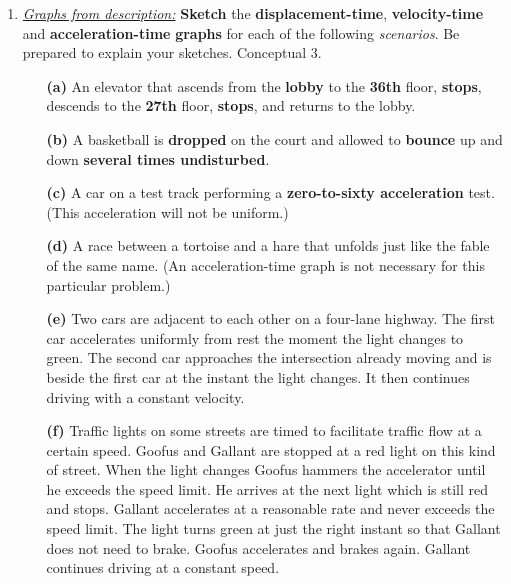 \documentclass[A4,12pt]{article}
\begin{document}
\begin{enumerate}[label=\bfseries (\arabic*)]
\begin{figure}[H]
\end{figure}
%
%
\clearpage
\newpage
%
%
%
%
%
%
%
%
%
%
%
%
%
%
%
%
%
%
%
%
%
%
%
%
%
%
%
\item \href{https://physics.info/motion-graphs/problems.shtml}{\it Graphs from description:} {\bf Sketch} the {\bf displacement-time}, {\bf velocity-time} and {\bf acceleration-time} {\bf graphs} for each of the following {\it scenarios}. Be prepared to explain your sketches. \cite{Elert} Conceptual 3.
\begin{itemize}
    \item[\bf (a)] An elevator that ascends from the {\bf lobby} to the {\bf 36th} floor, {\bf stops}, descends to the {\bf 27th} floor, {\bf stops}, and returns to the lobby.
%
    \item[\bf (b)] A basketball is {\bf dropped} on the court and allowed to {\bf bounce} up and down {\bf several times undisturbed}.
    \item[\bf (c)] A car on a test track performing a {\bf zero-to-sixty acceleration} test. (This acceleration will not be uniform.)
    \item[\bf (d)] A race between a tortoise and a hare that unfolds just like the fable of the same name. (An acceleration-time graph is not necessary for this particular problem.)
    \item[\bf (e)] Two cars are adjacent to each other on a four-lane highway. The first car accelerates uniformly from rest the moment the light changes to green. The second car approaches the intersection already moving and is beside the first car at the instant the light changes. It then continues driving with a constant velocity.
    \item[\bf (f)] Traffic lights on some streets are timed to facilitate traffic flow at a certain speed. Goofus and Gallant are stopped at a red light on this kind of street. When the light changes Goofus hammers the accelerator until he exceeds the speed limit. He arrives at the next light which is still red and stops. Gallant accelerates at a reasonable rate and never exceeds the speed limit. The light turns green at just the right instant so that Gallant does not need to brake. Goofus accelerates and brakes again. Gallant continues driving at a constant speed.

\end{itemize}
\end{enumerate}
\end{document}
